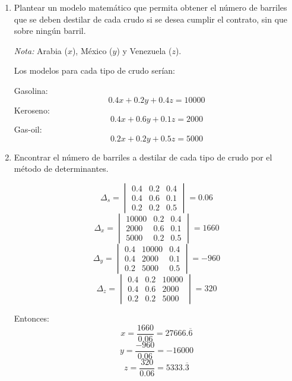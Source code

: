 \documentclass[12pt,a4paper]{article}
\begin{document}
\begin{enumerate}
    \begin{enumerate}
        \item Plantear un modelo matemático que permita obtener el número de barriles que se deben destilar de cada crudo si se desea cumplir el contrato, sin que sobre ningún barril.
        
        \noindent\textit{Nota:} Arabia (\(x\)), México (\(y\)) y Venezuela (\(z\)).
        
        Los modelos para cada tipo de crudo serían:
        
        Gasolina:
        \[
        0.4x + 0.2y + 0.4z = 10000
        \]
        Keroseno:
        \[
        0.4x + 0.6y + 0.1z = 2000
        \]
        Gas-oil:
        \[
        0.2x + 0.2y + 0.5z = 5000
        \]
        
        \item Encontrar el número de barriles a destilar de cada tipo de crudo por el método de determinantes.
        \begin{multicols}{2}
            
        \[
        \Delta_s = \begin{vmatrix} 0.4 & 0.2 & 0.4 \\ 0.4 & 0.6 & 0.1 \\ 0.2 & 0.2 & 0.5 \end{vmatrix} = 0.06
        \]
        \[
        \Delta_x = \begin{vmatrix} 10000 & 0.2 & 0.4 \\ 2000 & 0.6 & 0.1 \\ 5000 & 0.2 & 0.5 \end{vmatrix} = 1660
        \]
        \[
        \Delta_y = \begin{vmatrix} 0.4 & 10000 & 0.4 \\ 0.4 & 2000 & 0.1 \\ 0.2 & 5000 & 0.5 \end{vmatrix} = -960
        \]
        \[
        \Delta_z = \begin{vmatrix} 0.4 & 0.2 & 10000 \\ 0.4 & 0.6 & 2000 \\ 0.2 & 0.2 & 5000 \end{vmatrix} = 320
        \]
        
        Entonces:
        \[
        x = \frac{1660}{0.06} = 27666.\overline{6}
        \]
        \[
        y = \frac{-960}{0.06} = -16000
        \]
        \[
        z = \frac{320}{0.06} = 5333.\overline{3}
        \]
        

\end{multicols}
\end{enumerate}
\end{enumerate}
\end{document}
